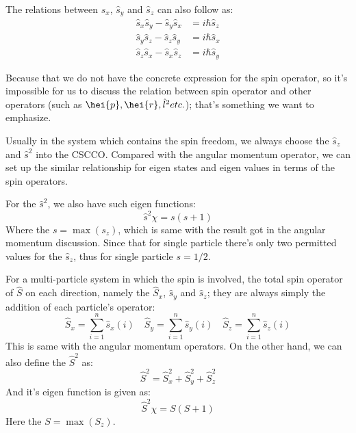 The relations between $\hat{s}_{x}$, $\hat{s}_{y}$ and $\hat{s}_{z}$
can also follow as:
\begin{align}\label{SPINeq:3}
\hat{s}_{x}\hat{s}_{y} - \hat{s}_{y}\hat{s}_{x} &= i\hbar\hat{s}_{z}
\nonumber \\
\hat{s}_{y}\hat{s}_{z} - \hat{s}_{z}\hat{s}_{y} &= i\hbar\hat{s}_{x}
\nonumber \\
\hat{s}_{z}\hat{s}_{x} - \hat{s}_{x}\hat{s}_{z} &= i\hbar\hat{s}_{y}
\end{align}

Because that we do not have the concrete expression for the spin
operator, so it's impossible for us to discuss the relation between
spin operator and other operators (such as $\hei{p}, \hei{r},
\hat{l}^{2} etc.$); that's something we want to emphasize.

Usually in the system which contains the spin freedom, we always
choose the $\hat{s}_{z}$ and $\hat{s}^{2}$ into the CSCCO. Compared
with the angular momentum operator, we can set up the similar
relationship for eigen states and eigen values in terms of the spin
operators.

For the $\hat{s}^{2}$, we also have such eigen functions:
\begin{equation}\label{}
\hat{s}^{2}\chi = s(s+1)
\end{equation}
Where the $s = \max(s_{z})$, which is same with the result got in
the angular momentum discussion. Since that for single particle
there's only two permitted values for the $\hat{s}_{z}$, thus for
single particle $s = 1/2$.

For a multi-particle system in which the spin is involved, the total
spin operator of $\hat{S}$ on each direction, namely the
$\hat{S}_{x}$, $\hat{s}_{y}$ and $\hat{s}_{z}$; they are always
simply the addition of each particle's operator:
\begin{equation}
  \hat{S}_{x} = \sum_{i=1}^{n}\hat{s}_{x}(i) \quad
  \hat{S}_{y} = \sum_{i=1}^{n}\hat{s}_{y}(i) \quad
  \hat{S}_{z} = \sum_{i=1}^{n}\hat{s}_{z}(i)
\end{equation}
This is same with the angular momentum operators. On the other hand,
we can also define the $\hat{S}^{2}$ as:
\begin{equation}\label{}
\hat{S}^{2} = \hat{S}_{x}^{2} + \hat{S}_{y}^{2} + \hat{S}_{z}^{2}
\end{equation}
And it's eigen function is given as:
\begin{equation}\label{}
\hat{S}^{2}\chi = S(S+1)
\end{equation}
Here the $S=\max(S_{z})$.


